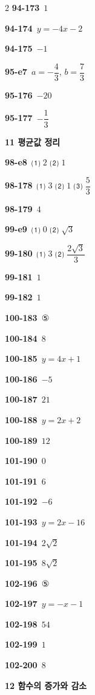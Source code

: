 \documentclass[10pt,a4paper]{article}
\begin{document}
\begin{multicols}{2}
\noindent\textbf{94-173}\ $1$\par
\noindent\textbf{94-174}\ $y=-4x-2$\par
\noindent\textbf{94-175}\ $-1$\par
\noindent\textbf{95-e7}\ $a=-\dfrac{4}{3}$, $b=\dfrac{7}{3}$\par
\noindent\textbf{95-176}\ $-20$\par
\noindent\textbf{95-177}\ $-\dfrac{1}{3}$\par
\noindent\textbf{11 평균값 정리}\par\smallskip
\noindent\textbf{98-e8}\ ⑴ $2$ ⑵ $1$\par
\noindent\textbf{98-178}\ ⑴ $3$ ⑵ $1$ ⑶ $\dfrac{5}{3}$\par
\noindent\textbf{98-179}\ $4$\par
\noindent\textbf{99-e9}\ ⑴ $0$ ⑵ $\sqrt{3}$\par
\noindent\textbf{99-180}\ ⑴ $3$ ⑵ $\dfrac{2\sqrt{3}}{3}$\par
\noindent\textbf{99-181}\ $1$\par
\noindent\textbf{99-182}\ $1$\par
\noindent\textbf{100-183}\ ⑤\par
\noindent\textbf{100-184}\ $8$\par
\noindent\textbf{100-185}\ $y=4x+1$\par
\noindent\textbf{100-186}\ $-5$\par
\noindent\textbf{100-187}\ $21$\par
\noindent\textbf{100-188}\ $y=2x+2$\par
\noindent\textbf{100-189}\ $12$\par
\noindent\textbf{101-190}\ $0$\par
\noindent\textbf{101-191}\ $6$\par
\noindent\textbf{101-192}\ $-6$\par
\noindent\textbf{101-193}\ $y=2x-16$\par
\noindent\textbf{101-194}\ $2\sqrt{2}$\par
\noindent\textbf{101-195}\ $8\sqrt{2}$\par
\noindent\textbf{102-196}\ ⑤\par
\noindent\textbf{102-197}\ $y=-x-1$\par
\noindent\textbf{102-198}\ $54$\par
\noindent\textbf{102-199}\ $1$\par
\noindent\textbf{102-200}\ $8$\par
\noindent\textbf{12 함수의 증가와 감소}\par\smallskip

\end{multicols}
\end{document}
